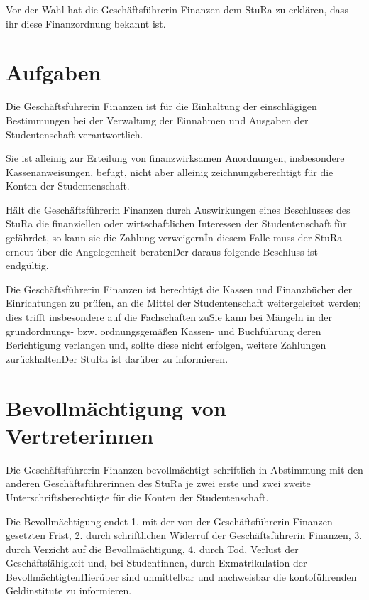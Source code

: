\begin{multicols}{2}
\Abs \Satz Vor der Wahl hat die Geschäftsführerin Finanzen dem StuRa zu erklären, dass ihr diese Finanzordnung bekannt ist.



\section{Aufgaben}

\Abs \Satz Die Geschäftsführerin Finanzen ist für die Einhaltung der einschlägigen Bestimmungen bei der Verwaltung der Einnahmen und Ausgaben der Studentenschaft verantwortlich.

\Abs \Satz Sie ist alleinig zur Erteilung von finanzwirksamen Anordnungen, insbesondere Kassenanweisungen, befugt, nicht aber alleinig zeichnungsberechtigt für die Konten der Studentenschaft.

\Abs \Satz Hält die Geschäftsführerin Finanzen durch Auswirkungen eines Beschlusses des StuRa die finanziellen oder wirtschaftlichen Interessen der Studentenschaft für gefährdet, so kann sie die Zahlung verweigern\. In diesem Falle muss der StuRa erneut über die Angelegenheit beraten\. Der daraus folgende Beschluss ist endgültig.

\Abs \Satz Die Geschäftsführerin Finanzen ist berechtigt die Kassen und Finanzbücher der Einrichtungen zu prüfen, an die Mittel der Studentenschaft weitergeleitet werden; dies trifft insbesondere auf die Fachschaften zu\. Sie kann bei Mängeln in der grundordnungs- bzw. ordnungsgemäßen Kassen- und Buchführung deren Berichtigung verlangen und, sollte diese nicht erfolgen, weitere Zahlungen zurückhalten\. Der StuRa ist darüber zu informieren.



\section{Bevollmächtigung von Vertreterinnen}

\Abs \Satz Die Geschäftsführerin Finanzen bevollmächtigt schriftlich in Abstimmung mit den anderen Geschäftsführerinnen des StuRa je zwei erste und zwei zweite Unterschriftsberechtigte für die Konten der Studentenschaft.

\Abs \Satz Die Bevollmächtigung endet
1. mit der von der Geschäftsführerin Finanzen gesetzten Frist,
2. durch schriftlichen Widerruf der Geschäftsführerin Finanzen,
3. durch Verzicht auf die Bevollmächtigung,
4. durch Tod, Verlust der Geschäftsfähigkeit und, bei Studentinnen, durch Exmatrikulation der Bevollmächtigten\. Hierüber sind unmittelbar und nachweisbar die kontoführenden Geldinstitute zu informieren.


\end{multicols}
